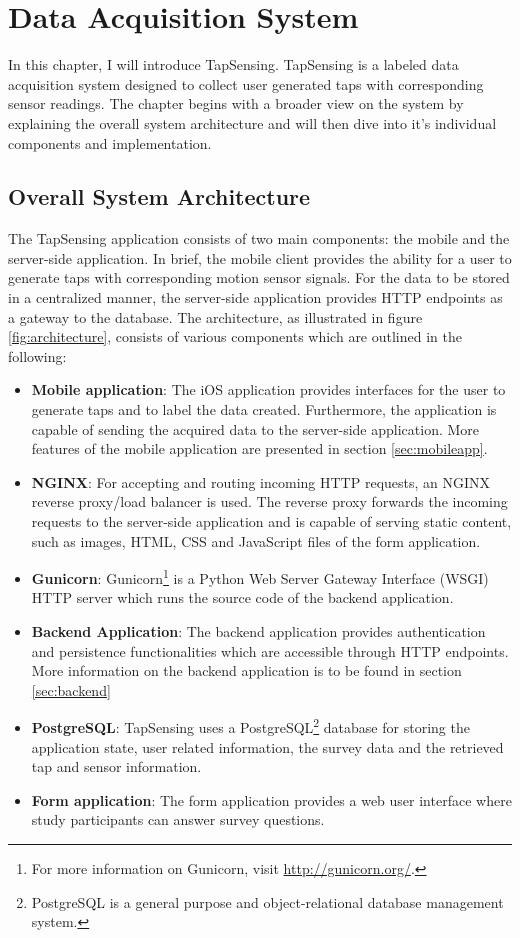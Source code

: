 \chapter{Data Acquisition System\label{cha:chapter3}}
In this chapter, I will introduce TapSensing. TapSensing is a labeled data acquisition system designed to collect user generated taps with corresponding sensor readings. The chapter begins with a broader view on the system by explaining the overall system architecture and will then dive into it's individual components and implementation.

\section{Overall System Architecture}

The TapSensing application consists of two main components: the mobile and the server-side application. In brief, the mobile client provides the ability for a user to generate taps with corresponding motion sensor signals. For the data to be stored in a centralized manner, the server-side application provides HTTP endpoints as a gateway to the database. The architecture, as illustrated in figure \ref{fig:architecture}, consists of various components which are outlined in the following:

\begin{itemize}
  \item \textbf{Mobile application}: The iOS application provides interfaces for the user to generate taps and to label the data created. Furthermore, the application is capable of sending the acquired data to the server-side application. More features of the mobile application are presented in section \ref{sec:mobileapp}. %
  \item \textbf{NGINX}: For accepting and routing incoming HTTP requests, an NGINX reverse proxy/load balancer is used. The reverse proxy forwards the incoming requests to the server-side application and is capable of serving static content, such as images, HTML, CSS and JavaScript files of the form application.
  \item \textbf{Gunicorn}: Gunicorn\footnote{For more information on Gunicorn, visit \url{http://gunicorn.org/}.} is a Python Web Server Gateway Interface (WSGI) HTTP server which runs the source code of the backend application.
  \item \textbf{Backend Application}: The backend application provides authentication and persistence functionalities which are accessible through HTTP endpoints. More information on the backend application is to be found in section \ref{sec:backend}
  \item \textbf{PostgreSQL}: TapSensing uses a PostgreSQL\footnote{PostgreSQL is a general purpose and object-relational database management system.} database for storing the application state, user related information, the survey data and the retrieved tap and sensor information.
  \item \textbf{Form application}: The form application provides a web user interface where study participants can answer survey questions.
\end{itemize}

